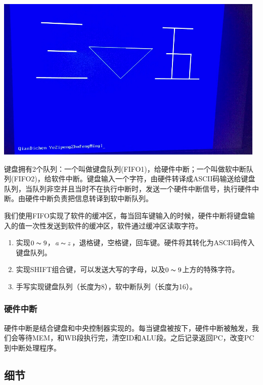 \begin{center}
    \includegraphics[width=13cm]{image/extension/35.JPG}
    \label{fig:35}
\end{center}

键盘拥有2个队列：一个叫做键盘队列(FIFO1)，给硬件中断；一个叫做软中断队列(FIFO2)，给软件中断。键盘输入一个字符，由硬件转译成ASCII码输送给键盘队列，当队列非空并且当时不在执行中断时，发送一个硬件中断信号，执行硬件中断。由硬件中断负责把信息转译到软中断队列。

我们使用FIFO实现了软件的缓冲区，每当回车键输入的时候，硬件中断将键盘输入的值一次性发送到软件的缓冲区，软件通过缓冲区读取字符。

\begin{enumerate}
    \item 实现$0 \thicksim 9$，$a \thicksim z$，退格键，空格键，回车键。硬件将其转化为ASCII码传入键盘队列。
    \item 实现SHIFT组合键，可以发送大写的字母，以及$0 \thicksim 9$上方的特殊字符。
    \item 手写实现键盘队列（长度为8），软中断队列（长度为16）。
\end{enumerate}

\subsubsection{硬件中断}

硬件中断是结合键盘和中央控制器实现的。每当键盘被按下，硬件中断被触发，我们会等待MEM，和WB段执行完，清空ID和ALU段。之后记录返回PC，改变PC到中断处理程序。

\subsection{细节}

